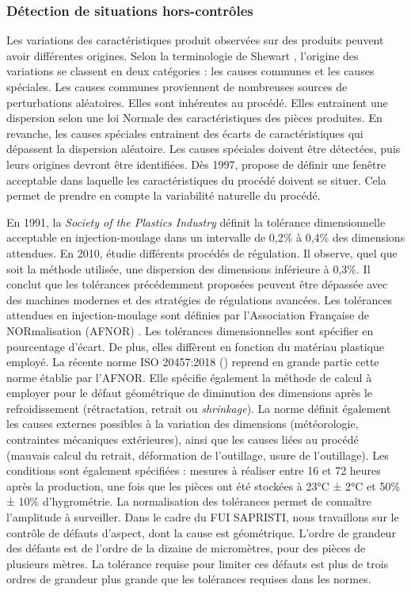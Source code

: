 \subsubsection{Détection de situations hors-contrôles}
Les variations des caractéristiques produit observées sur des produits peuvent avoir différentes origines.
Selon la terminologie de Shewart \cite{shewhart_economic_1930}, l'origine des variations se classent en deux catégories : les causes communes et les causes spéciales.
Les causes communes proviennent de nombreuses sources de perturbations aléatoires.
Elles sont inhérentes au procédé.
Elles entrainent une dispersion selon une loi Normale des caractéristiques des pièces produites.
En revanche, les causes spéciales entrainent des écarts de caractéristiques qui dépassent la dispersion aléatoire.
Les causes spéciales doivent être détectées, puis leurs origines devront être identifiées.
Dès 1997, \cite{sherbelis_methods_1997} propose de définir une fenêtre acceptable dans laquelle les caractéristiques du procédé doivent se situer.
Cela permet de prendre en compte la variabilité naturelle du procédé.

En 1991, la \textit{Society of the Plastics Industry} \cite{berins_spi_1991} définit la tolérance dimensionnelle acceptable en injection-moulage dans un intervalle de 0,2\% à 0,4\% des dimensions attendues.
En 2010, \cite{kazmer_comparison_2010} étudie différents procédés de régulation. Il observe, quel que soit la méthode utilisée, une dispersion des dimensions inférieure à 0,3\%.
Il conclut que les tolérances précédemment proposées peuvent être dépassée avec des machines modernes et des stratégies de régulations avancées.
Les tolérances attendues en injection-moulage sont définies par l’Association Française de NORmalisation (AFNOR) \cite{afnor_nf_1987}.
Les tolérances dimensionnelles sont spécifier en pourcentage d'écart.
De plus, elles diffèrent en fonction du matériau plastique employé.
La récente norme ISO {20457:2018} (\cite{ISO_20457_2018}) reprend en grande partie cette norme établie par l'AFNOR.
Elle spécifie également la méthode de calcul à employer pour le défaut géométrique de diminution des dimensions après le refroidissement (rétractation, retrait ou \textit{shrinkage}).
La norme définit également les causes externes possibles à la variation des dimensions (météorologie, contraintes mécaniques extérieures), ainsi que les causes liées au procédé (mauvais calcul du retrait, déformation de l'outillage, usure de l'outillage).
Les conditions sont également spécifiées : mesures à réaliser entre 16 et 72 heures après la production, une fois que les pièces ont été stockées à 23°C ± 2°C et 50\% ± 10\% d'hygrométrie.
La normalisation des tolérances permet de connaître l'amplitude à surveiller.
Dans le cadre du FUI SAPRISTI, nous travaillons sur le contrôle de défauts d'aspect, dont la cause est géométrique.
L'ordre de grandeur des défauts est de l'ordre de la dizaine de micromètres, pour des pièces de plusieurs mètres.
La tolérance requise pour limiter ces défauts est plus de trois ordres de grandeur plus grande que les tolérances requises dans les normes.

